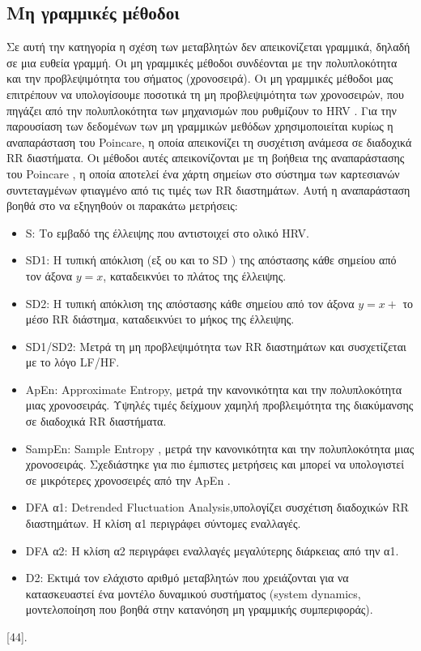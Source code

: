 \subsection{Μη γραμμικές μέθοδοι}
Σε αυτή την κατηγορία η σχέση των μεταβλητών δεν απεικονίζεται γραμμικά, δηλαδή σε μια ευθεία γραμμή. Οι μη γραμμικές μέθοδοι συνδέονται με την πολυπλοκότητα και την προβλεψιμότητα του σήματος (χρονοσειρά). Οι μη γραμμικές μέθοδοι μας επιτρέπουν να υπολογίσουμε ποσοτικά τη μη προβλεψιμότητα των χρονοσειρών, που πηγάζει από την πολυπλοκότητα των μηχανισμών που ρυθμίζουν το  \en HRV \gr. Για την παρουσίαση των δεδομένων των μη γραμμικών μεθόδων χρησιμοποιείται κυρίως η αναπαράσταση του \en Poincare, \gr η οποία απεικονίζει τη συσχέτιση ανάμεσα σε διαδοχικά \en RR \gr διαστήματα. Οι μέθοδοι αυτές απεικονίζονται με τη βοήθεια της αναπαράστασης του \en Poincare \gr, η οποία αποτελεί ένα χάρτη σημείων στο σύστημα των καρτεσιανών συντεταγμένων φτιαγμένο από τις τιμές των \en RR \gr
διαστημάτων. Αυτή η αναπαράσταση βοηθά στο να εξηγηθούν οι παρακάτω μετρήσεις:\begin{itemize}
	\item \en S: \gr Το εμβαδό της έλλειψης που αντιστοιχεί στο ολικό \en HRV. \gr
	\item \en SD1: \gr Η τυπική απόκλιση (εξ ου και το \en SD \gr) της απόστασης κάθε σημείου από τον άξονα $y=x$, καταδεικνύει το πλάτος της έλλειψης.
	\item \en SD2: \gr Η τυπική απόκλιση της απόστασης κάθε σημείου από τον άξονα $y=x +$ το μέσο \en RR \gr διάστημα, καταδεικνύει το μήκος της έλλειψης. 
	\item \en SD1/SD2: \gr Μετρά τη μη προβλεψιμότητα των \en RR \gr διαστημάτων και συσχετίζεται με το λόγο \en LF/HF. \gr
	\item \en ApEn: Approximate Entropy\gr , μετρά την κανονικότητα και την πολυπλοκότητα μιας χρονοσειράς. Υψηλές τιμές δείχμουν χαμηλή προβλειμότητα της διακύμανσης σε διαδοχικά \en RR \gr διαστήματα.
	\item \en SampEn: Sample Entropy \gr, μετρά την κανονικότητα και την πολυπλοκότητα μιας χρονοσειράς. Σχεδιάστηκε για πιο έμπιστες μετρήσεις και μπορεί να υπολογιστεί σε μικρότερες χρονοσειρές από την \en ApEn \gr.
	\item \en DFA \gr α1: \en Detrended Fluctuation Analysis,\gr υπολογίζει συσχέτιση διαδοχικών RR διαστημάτων. Η κλίση α1 περιγράφει σύντομες εναλλαγές.
	\item \en DFA \gr α2: Η κλίση α2 περιγράφει εναλλαγές μεγαλύτερης διάρκειας από την α1. 
	\item \en D2: \gr Εκτιμά τον ελάχιστο αριθμό μεταβλητών που χρειάζονται για να κατασκευαστεί ένα μοντέλο δυναμικού συστήματος \en (system dynamics, \gr μοντελοποίηση που βοηθά στην κατανόηση μη γραμμικής συμπεριφοράς).
\end{itemize}[44].
